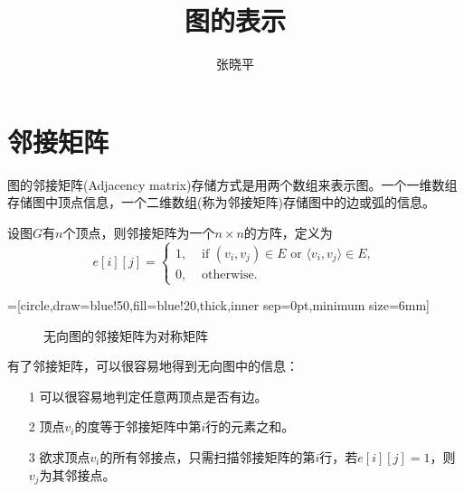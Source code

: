 \documentclass[10pt]{article}
\begin{document}
\renewcommand{\proofname}{\textbf{证明}}
\newtheorem{li}{例}
\newtheorem{jielun}{结论}
\newtheorem{dingli}{定理}
\newtheorem{mingti}{{命题}} 
\newtheorem{yinli}{{引理}} 
\newtheorem{tuilun}{{推论}}
\newtheorem{dingyi}{{定义}} 
\newtheorem*{jie}{{解}}
\newtheorem*{zhengming}{{证明}}
\newtheorem{zhu}{{注}}
\newtheorem*{zhu*}{{注}}
\newtheorem{xingzhi}{{性质}}
\newtheorem{wenti}{{问题}}
\newtheorem{xiti}{{习题}}

\title{图的表示}
\author{张晓平}
\maketitle

\section{邻接矩阵}


图的邻接矩阵(Adjacency matrix)存储方式是用两个数组来表示图。一个一维数组存储图中顶点信息，一个二维数组(称为邻接矩阵)存储图中的边或弧的信息。

设图$G$有$n$个顶点，则邻接矩阵为一个$n\times n$的方阵，定义为
$$
e[i][j]=\left\{
\begin{array}{ll}
1,& \mbox{ if $(v_i,v_j)\in E$ or $\langle v_i,v_j\rangle\in E$}, \\[0.05in]
0,& \mbox{ otherwise}.
\end{array}
\right.
$$


=[circle,draw=blue!50,fill=blue!20,thick,inner sep=0pt,minimum size=6mm]

\begin{figure}
\centering

\caption{无向图的邻接矩阵为对称矩阵}
\end{figure}

有了邻接矩阵，可以很容易地得到无向图中的信息：
\begin{itemize}
\item[1] 可以很容易地判定任意两顶点是否有边。 
\item[2] 顶点$v_i$的度等于邻接矩阵中第$i$行的元素之和。
\item[3] 欲求顶点$v_i$的所有邻接点，只需扫描邻接矩阵的第$i$行，若$e[i][j]=1$，则$v_j$为其邻接点。
\end{itemize}
\end{document}

